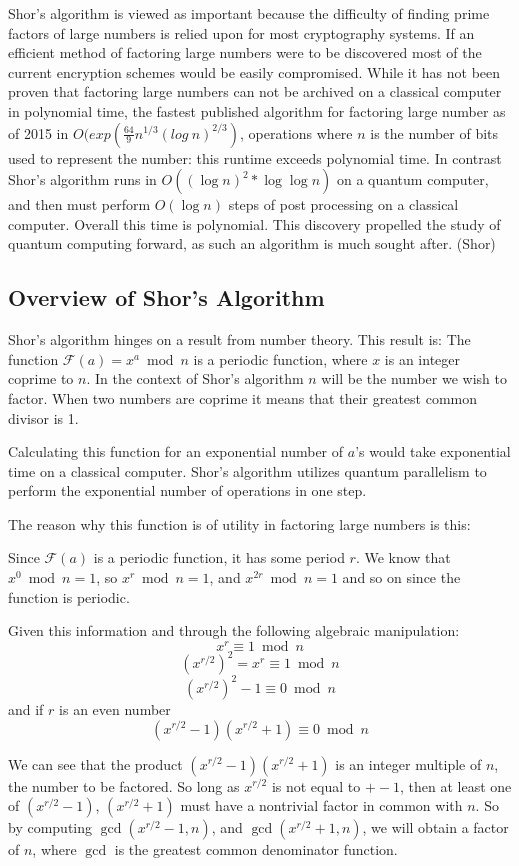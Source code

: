 \documentclass[]{article}
\begin{document}
Shor's algorithm is viewed as important because the difficulty of
finding prime factors of large numbers is relied upon for most
cryptography systems. If an efficient method of factoring large
numbers were to be discovered most of the current encryption schemes
would be easily compromised. While it has not been proven that
factoring large numbers can not be archived on a classical computer in
polynomial time, the fastest published algorithm for factoring large
number as of 2015 in $O(exp(\frac{64}{9}n^{1/3} (log\ n)^{2/3})$,
operations where $n$ is the number of bits used to represent the
number: this runtime exceeds polynomial time. In contrast Shor's
algorithm runs in $O((\log n)^{2} * \log \log n)$ on a quantum
computer, and then must perform $O(\log n)$ steps of post processing
on a classical computer. Overall this time is polynomial. This
discovery propelled the study of quantum computing forward, as such an
algorithm is much sought after. (Shor)

\subsection{Overview of Shor's Algorithm}

	Shor's algorithm hinges on a result from number theory.  This
result is:
	The function $\mathcal{F}(a) = x^{a} \bmod n$ is a periodic
function, where $x$ is an integer coprime to $n$. In the context of
Shor's algorithm $n$ will be the number we wish to factor. When two
numbers are coprime it means that their greatest common divisor is 1.

	Calculating this function for an exponential number of $a$'s
would take exponential time on a classical computer.  Shor's algorithm
utilizes quantum parallelism to perform the exponential number of
operations in one step.

	The reason why this function is of utility in factoring large
numbers is this:

	Since $\mathcal{F}(a)$ is a periodic function, it has some
period $r$. We know that $x^{0} \bmod n = 1$, so $x^{r} \bmod n = 1$, and
$x^{2r} \bmod n = 1$ and so on since the function is periodic.

	Given this information and through the following algebraic
manipulation:
	\[x^{r} \equiv 1 \bmod n\]
	\[(x^{r/2})^{2} = x^{r} \equiv 1 \bmod n\]
	\[(x^{r/2})^{2} - 1 \equiv 0 \bmod n\] 
	and if $r$ is an even number
	\[(x^{r/2} - 1)(x^{r/2} + 1) \equiv 0 \bmod n\]

We can see that the product $(x^{r/2} - 1)(x^{r/2} + 1)$ is an integer
multiple of $n$, the number to be factored. So long as $x^{r/2}$ is
not equal to $+- 1$, then at least one of $(x^{r/2} - 1)$, $(x^{r/2} +
1)$ must have a nontrivial factor in common with $n$. So by computing
$\gcd(x^{r/2} - 1, n)$, and $\gcd(x^{r/2} + 1, n)$, we will obtain a
factor of $n$, where $\gcd$ is the greatest common denominator
function.
\end{document}
